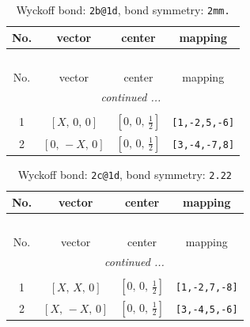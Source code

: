 \documentclass[fleqn,8pt]{jsarticle}
\begin{document}
\renewcommand{\arraystretch}{1.2}
\begin{longtable}{cccc}
\caption{Wyckoff bond: {\tt 2b@1d}, bond symmetry: {\tt 2mm.}}
 \\
 \hline \hline
No. & vector & center & mapping \\ \hline \endfirsthead

\multicolumn{3}{l}{\tablename\ \thetable{}} \\
 \hline \hline
No. & vector & center & mapping \\ \hline \endhead

 \hline \hline
\multicolumn{3}{r}{\footnotesize\it continued ...} \\ \endfoot

 \hline \hline
\multicolumn{3}{r}{} \\ \endlastfoot

1 & $\left[ X,\, 0,\, 0 \right]$ & $\left[ 0,\, 0,\, \frac{1}{2} \right]$ & {\tt [1,-2,5,-6]} \\ \hline
2 & $\left[ 0,\, - X,\, 0 \right]$ & $\left[ 0,\, 0,\, \frac{1}{2} \right]$ & {\tt [3,-4,-7,8]} \\
\end{longtable}
\renewcommand{\arraystretch}{1.2}
\begin{longtable}{cccc}
\caption{Wyckoff bond: {\tt 2c@1d}, bond symmetry: {\tt 2.22}}
 \\
 \hline \hline
No. & vector & center & mapping \\ \hline \endfirsthead

\multicolumn{3}{l}{\tablename\ \thetable{}} \\
 \hline \hline
No. & vector & center & mapping \\ \hline \endhead

 \hline \hline
\multicolumn{3}{r}{\footnotesize\it continued ...} \\ \endfoot

 \hline \hline
\multicolumn{3}{r}{} \\ \endlastfoot

1 & $\left[ X,\, X,\, 0 \right]$ & $\left[ 0,\, 0,\, \frac{1}{2} \right]$ & {\tt [1,-2,7,-8]} \\ \hline
2 & $\left[ X,\, - X,\, 0 \right]$ & $\left[ 0,\, 0,\, \frac{1}{2} \right]$ & {\tt [3,-4,5,-6]} \\
\end{longtable}
\renewcommand{\arraystretch}{1.2}
\end{document}
